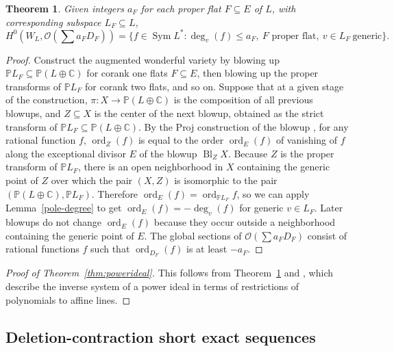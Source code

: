 \documentclass{amsart}
\newtheorem{theorem}{Theorem}[section]
\newcommand{\Sym}{\operatorname{Sym}}
\newcommand{\F}{\mathbb{C}}
\renewcommand{\P}{\mathbb{P}}
\newcommand{\ord}{\operatorname{ord}}
\theoremstyle{definition}
\begin{document}
\begin{theorem}\label{thm:direction}
    Given integers $a_F$ for each proper flat $F \subseteq E$ of $L$,
    with corresponding subspace $L_F \subseteq L$, 
    \[
        H^0(W_L, \mathcal{O}(\sum a_F D_F)) = \{f \in \Sym L^* 
            : \deg_v(f) \leq a_F,\ F \text{ proper 
        flat},\ v \in L_F\ \text{generic}\}.
    \]
\end{theorem}
\begin{proof}
    Construct the augmented wonderful variety by blowing up $\P L_F 
    \subseteq \P(L \oplus \F)$ for corank one flats $F 
    \subseteq E$, then blowing up the proper transforms of $\P L_F$ for 
    corank two flats, and so on. 
    Suppose that at a given stage of the construction, $\pi \colon X \to \P(L \oplus 
    \F)$ is the composition of all previous blowups, and $Z \subseteq X$ 
    is the center of the next blowup, obtained 
    as the strict transform of $\P L_F \subseteq \P(L \oplus \F)$. By 
    the Proj construction of the blowup \cite[Theorem 22.3.2]{VakilNotes}, for 
    any rational function $f$, $\ord_{Z}(f)$ is equal to the order 
    $\ord_E(f)$ of 
    vanishing of $f$ along the exceptional divisor $E$ of the blowup 
    $\operatorname{Bl}_Z X$. 
    Because $Z$ is the proper transform of $\P L_F$, there is an open 
    neighborhood in $X$ containing the generic point of $Z$ over which 
    the pair $(X,Z)$ is isomorphic to the pair $(\P(L \oplus \F), 
    \P L_F)$. Therefore $\ord_E(f) = \ord_{\P L_F} f$, so we can apply 
    Lemma~\ref{pole-degree} to get $\ord_E(f) = - \deg_v(f)$ for generic 
    $v \in L_F$. Later blowups do not change $\ord_E(f)$ because they 
    occur outside a neighborhood containing the generic point of $E$. 
    The global sections of $\mathcal{O}(\sum a_F 
    D_F)$ consist of rational functions $f$ such that $\ord_{D_F}(f)$ is at least $-a_F$.
\end{proof}

\begin{proof}[Proof of Theorem~\ref{thm:powerideal}]
This follows from Theorem~\ref{thm:direction} and \cite[Proposition 2.6]{ArdilaPostnikov}, which describe the inverse system of a power ideal in terms of restrictions of polynomials to affine lines.  
\end{proof}



\subsection{Deletion-contraction short exact sequences}
\end{document}
